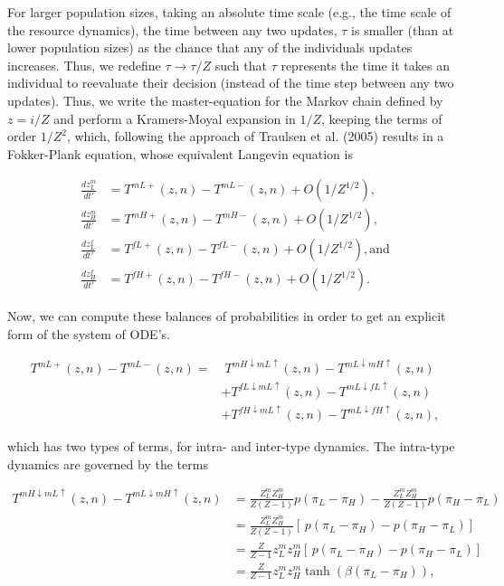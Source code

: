 \documentclass{article}
\begin{document}
For larger population sizes, taking an absolute time scale (e.g., the time scale of the resource dynamics), the time between any two updates, $\tau$ is smaller (than at lower population sizes) as the chance that any of the individuals updates increases. Thus, we redefine $\tau\rightarrow \tau/Z$ such that $\tau$ represents the time it takes an individual to reevaluate their decision (instead of the time step between any two updates). Thus, we write the master-equation for the Markov chain defined by $z=i/Z$ and perform a Kramers-Moyal expansion in $1/Z$, keeping the terms of order $1/Z^2$, which, following the approach of Traulsen et al. (2005) results in a Fokker-Plank equation, whose equivalent Langevin equation is 

\begin{align}
\frac{d z^m_L}{dt'}&= T^{mL+}(z,n)-T^{mL-}(z,n)+O(1/Z^{1/2}),\\
\frac{d z^m_H}{dt'}&= T^{mH+}(z,n)-T^{mH-}(z,n)+O(1/Z^{1/2}),\\
\frac{d z^f_L}{dt'}&= T^{fL+}(z,n)-T^{fL-}(z,n)+O(1/Z^{1/2}), \text{and}\\
\frac{d z^f_H}{dt'}&= T^{fH+}(z,n)-T^{fH-}(z,n)+O(1/Z^{1/2}).
\end{align}

Now, we can compute these balances of probabilities in order to get an explicit form of the system of ODE's. 

\begin{align}
T^{mL+}(z,n)-T^{mL-}(z,n) = &
    \;T^{mH\downarrow mL\uparrow}(z,n) - T^{mL\downarrow mH\uparrow}(z,n)\\\nonumber
    &+T^{fL\downarrow mL\uparrow}(z,n) - T^{mL\downarrow fL\uparrow}(z,n)\\\nonumber
    &+T^{fH\downarrow mL\uparrow}(z,n) - T^{mL\downarrow fH\uparrow}(z,n),
\end{align}

which has two types of terms, for intra- and inter-type dynamics. The intra-type dynamics are governed by the terms

\begin{align}
T^{mH\downarrow mL\uparrow}(z,n) - T^{mL\downarrow mH\uparrow}(z,n) &= \frac{Z^m_L Z^m_H}{Z(Z-1)} p(\pi_L-\pi_H) - \frac{Z^m_L Z^m_H}{Z(Z-1)}  p(\pi_H-\pi_L)\\\nonumber
&= \frac{Z^m_L Z^m_H}{Z(Z-1)}\left[\,p(\pi_L-\pi_H)- p(\pi_H-\pi_L)\right]\\\nonumber
&= \frac{Z}{Z-1}z_L^mz_H^m\left[\,p(\pi_L-\pi_H)- p(\pi_H-\pi_L)\right]\\\nonumber
&=\frac{Z}{Z-1}  z^m_L z^m_H \tanh{\left(\beta(\pi_L-\pi_H)\right)},
\end{align}
\end{document}
